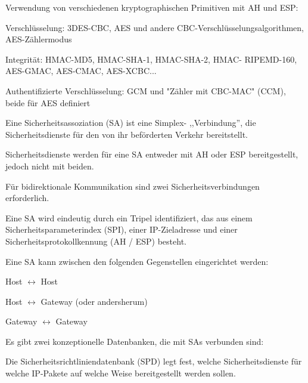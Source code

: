 \documentclass[a4paper]{article}
\begin{document}
\begin{multicols}{3}
\begin{itemize*}
            \begin{itemize*}
                  \item Verwendung von verschiedenen kryptographischen Primitiven mit AH und ESP:
                  \begin{itemize*}
                        \item Verschlüsselung: 3DES-CBC, AES und andere CBC-Verschlüsselungsalgorithmen, AES-Zählermodus
                        \item Integrität: HMAC-MD5, HMAC-SHA-1, HMAC-SHA-2, HMAC- RIPEMD-160, AES-GMAC, AES-CMAC, AES-XCBC...
                        \item Authentifizierte Verschlüsselung: GCM und "Zähler mit CBC-MAC" (CCM), beide für AES definiert
                  \end{itemize*}
            \end{itemize*}
            \item Eine Sicherheitsassoziation (SA) ist eine Simplex- ,,Verbindung'', die Sicherheitsdienste für den von ihr beförderten Verkehr bereitstellt.
            \begin{itemize*}
                  \item Sicherheitsdienste werden für eine SA entweder mit AH oder ESP bereitgestellt, jedoch nicht mit beiden.
                  \item Für bidirektionale Kommunikation sind zwei Sicherheitsverbindungen erforderlich.
                  \item Eine SA wird eindeutig durch ein Tripel identifiziert, das aus einem Sicherheitsparameterindex (SPI), einer IP-Zieladresse und einer Sicherheitsprotokollkennung (AH / ESP) besteht.
                  \item Eine SA kann zwischen den folgenden Gegenstellen eingerichtet werden:
                  \begin{itemize*}
                        \item Host $\leftrightarrow$ Host
                        \item Host $\leftrightarrow$ Gateway (oder andersherum)
                        \item Gateway $\leftrightarrow$ Gateway
                  \end{itemize*}
                  \item Es gibt zwei konzeptionelle Datenbanken, die mit SAs verbunden sind:
                  \begin{itemize*}
                        \item Die Sicherheitsrichtliniendatenbank (SPD) legt fest, welche Sicherheitsdienste für welche IP-Pakete auf welche Weise bereitgestellt werden sollen.

\end{itemize*}
\end{itemize*}
\end{itemize*}
\end{multicols}
\end{document}
